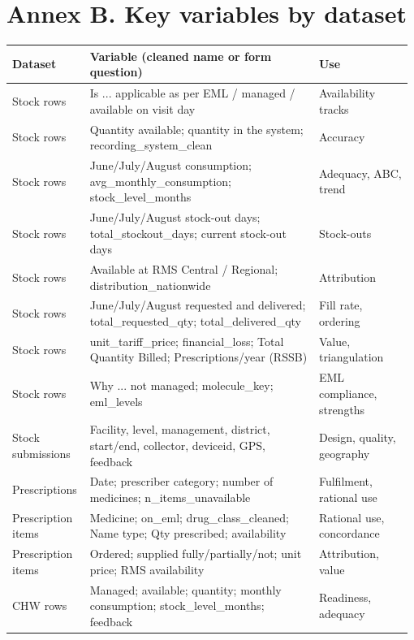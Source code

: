 \documentclass[10pt,a4paper]{article}
\begin{document}
\section{Annex B. Key variables by dataset}
{\footnotesize\setlength{\tabcolsep}{3pt}
\begin{longtable}{>{\raggedright\arraybackslash}p{0.184\linewidth}>{\raggedright\arraybackslash}p{0.565\linewidth}>{\raggedright\arraybackslash}p{0.231\linewidth}}
\rowcolor{navy}\textbf{\color{white}Dataset} & \textbf{\color{white}Variable (cleaned name or form question)} & \textbf{\color{white}Use} \\
\endhead
Stock rows & Is ... applicable as per EML / managed / available on visit day & Availability tracks \\
\rowcolor{band}Stock rows & Quantity available; quantity in the system; recording\_system\_clean & Accuracy \\
Stock rows & June/July/August consumption; avg\_monthly\_consumption; stock\_level\_months & Adequacy, ABC, trend \\
\rowcolor{band}Stock rows & June/July/August stock-out days; total\_stockout\_days; current stock-out days & Stock-outs \\
Stock rows & Available at RMS Central / Regional; distribution\_nationwide & Attribution \\
\rowcolor{band}Stock rows & June/July/August requested and delivered; total\_requested\_qty; total\_delivered\_qty & Fill rate, ordering \\
Stock rows & unit\_tariff\_price; financial\_loss; Total Quantity Billed; Prescriptions/year (RSSB) & Value, triangulation \\
\rowcolor{band}Stock rows & Why ... not managed; molecule\_key; eml\_levels & EML compliance, strengths \\
Stock submissions & Facility, level, management, district, start/end, collector, deviceid, GPS, feedback & Design, quality, geography \\
\rowcolor{band}Prescriptions & Date; prescriber category; number of medicines; n\_items\_unavailable & Fulfilment, rational use \\
Prescription items & Medicine; on\_eml; drug\_class\_cleaned; Name type; Qty prescribed; availability & Rational use, concordance \\
\rowcolor{band}Prescription items & Ordered; supplied fully/partially/not; unit price; RMS availability & Attribution, value \\
CHW rows & Managed; available; quantity; monthly consumption; stock\_level\_months; feedback & Readiness, adequacy \\
\end{longtable}}
\end{document}
